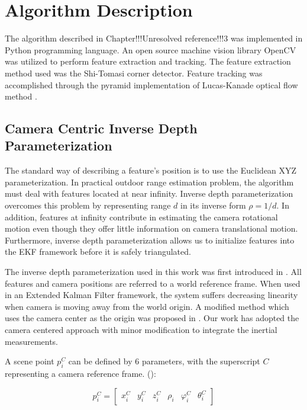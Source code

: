 \chapter{Algorithm Description}

The algorithm described in Chapter!!!Unresolved reference!!!3 was 
implemented in Python programming language. An open source machine 
vision library OpenCV was utilized to perform feature extraction and 
tracking. The feature extraction method used was the Shi-Tomasi corner 
detector. Feature tracking was accomplished through the pyramid 
implementation of Lucas-Kanade optical flow method . 

\section{Camera Centric Inverse Depth Parameterization}
The standard way of describing a feature's position is to use the 
Euclidean XYZ parameterization. In practical outdoor range estimation 
problem, the algorithm must deal with features located at near infinity. 
Inverse depth parameterization overcomes this problem by representing 
range $d$ in its inverse form $\rho =1/d$. In addition, features at 
infinity contribute in estimating the camera rotational motion even 
though they offer little information on camera translational motion. 
Furthermore, inverse depth parameterization allows us to initialize 
features into the EKF framework before it is safely triangulated.

The inverse depth parameterization used in this work was first 
introduced in . All features and camera positions are referred to a 
world reference frame. When used in an Extended Kalman Filter framework, 
the system suffers decreasing linearity when camera is moving away from 
the world origin. A modified method which uses the camera center as the 
origin was proposed in . Our work has adopted the camera centered 
approach with minor modification to integrate the inertial measurements.


A scene point $p_{i}^{C}$ can be defined by 6 parameters, with the 
superscript $C$ representing a camera reference frame. ():

\begin{equation}
p_{i}^{C}=\begin{bmatrix}
x_{i}^{C} & y_{i}^{C} & z_{i}^{C} & \rho _{i} & \varphi _{i}^{C} & 
\theta _{i}^{C} 
\end{bmatrix}
\end{equation}


